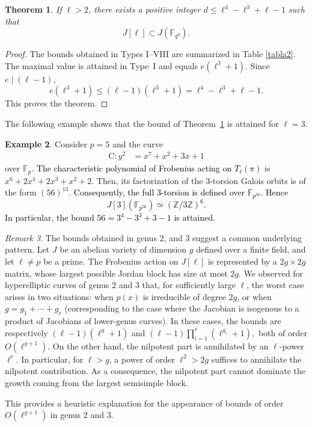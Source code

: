 \documentclass[11pt,a4paper]{article}
\theoremstyle{plain}
\newtheorem{theorem}{Theorem}[section]
\theoremstyle{definition}
\newtheorem{example}[theorem]{Example}
\theoremstyle{remark}
\newtheorem{remark}[theorem]{Remark}
\newcommand{\verde}[1]{\textcolor{black}{#1}}
\newcommand{\azul}[1]{\textcolor{black}{#1}}
\newcommand\C{\mathrm{C}}
\begin{document}
\begin{theorem}\label{teo1}
If $ \ell > 2$, there exists a positive integer \(d \leq \ell^4 - \ell^3 + \ell - 1\) such that
\[
J[\ell] \subset J(\mathbb{F}_{q^d}).
\] 
\end{theorem} 

\begin{proof}
The bounds obtained in Types I--VIII are summarized in Table \ref{tabla2}.
The maximal value is attained in Type~I and equals $e(\ell^3+1)$.
Since $e\mid(\ell-1)$,
\[
e(\ell^3+1)\le (\ell-1)(\ell^3+1)
=\ell^4-\ell^3+\ell-1.
\]
This proves the theorem.
\end{proof}

The following example shows that the bound of Theorem~\ref{teo1} is attained for $\ell=3$.



\begin{example}\label{example2}
Consider $p=5$ and the curve %
\begin{align*}
\C : y^2&= x^7 + x^2 + 3x + 1
\end{align*} 
over $\mathbb{F}_p$. \verde{ The characteristic polynomial of Frobenius acting on $T_{\ell}(\pi)$} is $x^6 + 2x^4 + 2x^3 + x^2 + 2$. Then, its factorization of the 3-torsion Galois orbits
is of the form $(56)^{13}$. 
\azul{Consequently, the full $3$-torsion is defined over
$\mathbb F_{p^{56}}$. Hence
\[
J[3](\mathbb F_{p^{56}})
\simeq (\mathbb Z/3\mathbb Z)^6.
\]
In particular, the bound $56=3^4-3^3+3-1$ is attained.
}
\end{example}


\begin{remark}
    The bounds obtained in genus $2$, and $3$ suggest a common underlying pattern.
Let $J$ be an abelian variety of dimension $g$ defined over a finite field, and let
$\ell \neq p$ be a prime. The Frobenius action on $J[\ell]$ is represented by a $2g \times 2g$ matrix, whose largest possible Jordan block has size at most $2g$.
We observed for hyperelliptic curves of genus $2$ and $3$ that, for sufficiently large  $\ell$, the worst case arises in two situations: when $p(x)$  is irreducible of degree $2g$, or when $g=g_1+\cdots+g_r$ (corresponding to the case where the Jacobian is isogenous to a product of Jacobians of lower-genus curves).
In these cases, the bounds are respectively $(\ell-1)(\ell^g+1)$ and $(\ell-1)\displaystyle\prod_{i=1}^r(\ell^{g_i}+1),$
both of order $O(\ell^{g+1})$.
On the other hand, the nilpotent part is annihilated by an $\ell$-power $\ell^r$. 
In particular, for $\ell > g$, a power of order $\ell^{2}>2g$ suffices to annihilate
the nilpotent contribution. As a consequence, the nilpotent part cannot dominate the
growth coming from the largest semisimple block.

This provides a heuristic explanation for the appearance of bounds of order
$O(\ell^{g+1})$ in genus $2$ and $3$. 

\end{remark}
\end{document}
